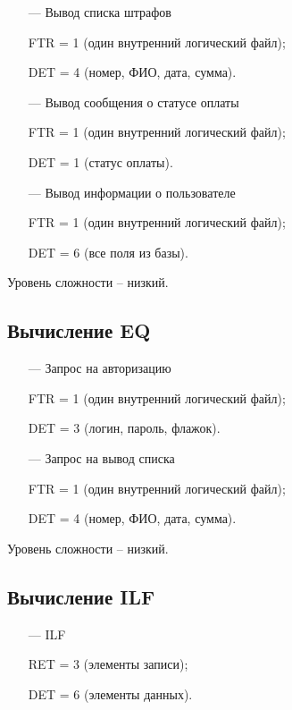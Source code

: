 \begin{itemize}
    \item[---] Вывод списка штрафов
    
    FTR = 1 (один внутренний логический файл);
    
    DET = 4 (номер, ФИО, дата, сумма).
    
    \item[---] Вывод сообщения о статусе оплаты
    
    FTR = 1 (один внутренний логический файл);
    
    DET = 1 (статус оплаты).
    
    \item[---] Вывод информации о пользователе
    
    FTR = 1 (один внутренний логический файл);
    
    DET = 6 (все поля из базы).

\end{itemize}

Уровень сложности – низкий.

\subsection*{Вычисление EQ}

\begin{itemize}
    \item[---] Запрос на авторизацию
    
    FTR = 1 (один внутренний логический файл);
    
    DET = 3 (логин, пароль, флажок).
    
    \item[---] Запрос на вывод списка
    
    FTR = 1 (один внутренний логический файл);
    
    DET = 4 (номер, ФИО, дата, сумма).
\end{itemize}

Уровень сложности – низкий.

\subsection*{Вычисление ILF}

\begin{itemize}
    \item[---] ILF
    
    RET = 3 (элементы записи);
    
    DET = 6 (элементы данных).
\end{itemize}

